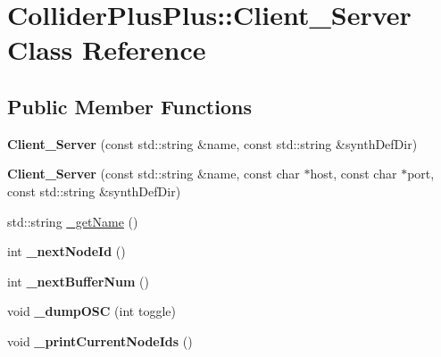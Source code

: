 \hypertarget{classColliderPlusPlus_1_1Client__Server}{\section{Collider\-Plus\-Plus\-:\-:Client\-\_\-\-Server Class Reference}
\label{classColliderPlusPlus_1_1Client__Server}
}
\subsection*{Public Member Functions}
\begin{DoxyCompactItemize}
\item 
\hypertarget{classColliderPlusPlus_1_1Client__Server_a76fc49a882d471430c948bec576bd23d}{{\bfseries Client\-\_\-\-Server} (const std\-::string \&name, const std\-::string \&synth\-Def\-Dir)}\label{classColliderPlusPlus_1_1Client__Server_a76fc49a882d471430c948bec576bd23d}

\item 
\hypertarget{classColliderPlusPlus_1_1Client__Server_a7782b29b222bfcd1e2a1fb880b257eb8}{{\bfseries Client\-\_\-\-Server} (const std\-::string \&name, const char $\ast$host, const char $\ast$port, const std\-::string \&synth\-Def\-Dir)}\label{classColliderPlusPlus_1_1Client__Server_a7782b29b222bfcd1e2a1fb880b257eb8}

\item 
std\-::string \hyperlink{classColliderPlusPlus_1_1Client__Server_ac2f5c4bddaf2bbd6a7ab15c8c42163e7}{\-\_\-get\-Name} ()
\item 
\hypertarget{classColliderPlusPlus_1_1Client__Server_aef5ff53324f90cae73b5a23f560e6cb7}{int {\bfseries \-\_\-next\-Node\-Id} ()}\label{classColliderPlusPlus_1_1Client__Server_aef5ff53324f90cae73b5a23f560e6cb7}

\item 
\hypertarget{classColliderPlusPlus_1_1Client__Server_a5f39e21b7834a06568250cce4cafae3c}{int {\bfseries \-\_\-next\-Buffer\-Num} ()}\label{classColliderPlusPlus_1_1Client__Server_a5f39e21b7834a06568250cce4cafae3c}

\item 
\hypertarget{classColliderPlusPlus_1_1Client__Server_a52205c38d60f01ecacb7d933f4755c02}{void {\bfseries \-\_\-dump\-O\-S\-C} (int toggle)}\label{classColliderPlusPlus_1_1Client__Server_a52205c38d60f01ecacb7d933f4755c02}

\item 
\hypertarget{classColliderPlusPlus_1_1Client__Server_a0e48411b1875280bed41a8d5011c1a7e}{void {\bfseries \-\_\-print\-Current\-Node\-Ids} ()}\label{classColliderPlusPlus_1_1Client__Server_a0e48411b1875280bed41a8d5011c1a7e}


\end{DoxyCompactItemize}
